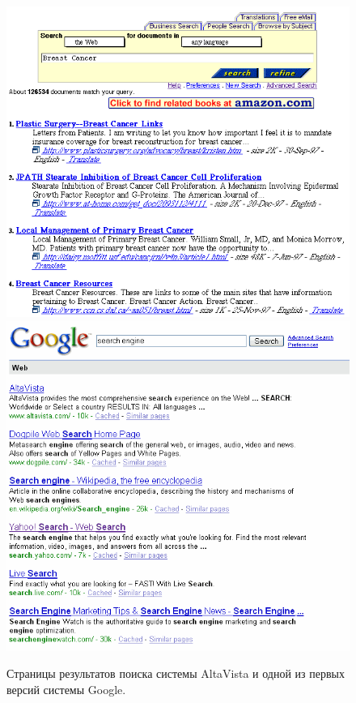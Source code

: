 \documentclass[12pt,a4paper]{report}
\begin{document}
\begin{figure}[]
  \centering
  \includegraphics[height=0.33\textheight]{pics/AltavistaResults.png}
  \includegraphics[height=0.33\textheight]{pics/Google-EarlyResults.png}
  \caption{Страницы результатов поиска системы AltaVista и одной из первых версий системы Google.}
  \label{early-search-engines}
\end{figure}
\end{document}
